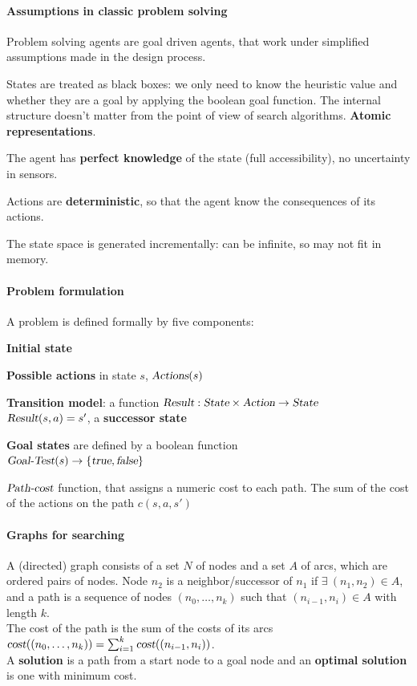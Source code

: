 \documentclass[10pt]{report}
\begin{document}
\paragraph{Assumptions in classic problem solving} Problem solving agents are goal driven agents, that work under simplified assumptions made in the design process.
\begin{list}{}{}
	\item States are treated as black boxes: we only need to know the heuristic value and whether they are a goal by applying the boolean goal function. The internal structure doesn't matter from the point of view of search algorithms. \textbf{Atomic representations}.
	\item The agent has \textbf{perfect knowledge} of the state (full accessibility), no uncertainty in sensors.
	\item Actions are \textbf{deterministic}, so that the agent know the consequences of its actions.
\end{list}
The state space is generated incrementally: can be infinite, so may not fit in memory.
\paragraph{Problem formulation} A problem is defined formally by five components:
\begin{list}{}{}
	\item \textbf{Initial state}
	\item \textbf{Possible actions} in state $s$, $\textsl{Actions}(s)$
	\item \textbf{Transition model}: a function $\textsl{Result}: \textsl{State}\times\textsl{Action}\rightarrow \textsl{State}$\\
	$\textsl{Result}(s,a) = s'$, a \textbf{successor state}
	\item \textbf{Goal states} are defined by a boolean function\\
	$\textsl{Goal-Test}(s) \rightarrow\{\textsl{true}, \textsl{false}\}$
	\item $\textsl{Path-cost}$ function, that assigns a numeric cost to each path. The sum of the cost of the actions on the path $c(s, a, s')$
\end{list}
\paragraph{Graphs for searching} A (directed) graph consists of a set $N$ of nodes and a set $A$ of arcs, which are ordered pairs of nodes. Node $n_2$ is a neighbor/successor of $n_1$ if $\exists\:(n_1, n_2)\in A$, and a path is a sequence of nodes $(n_0,\ldots,n_k)$ such that $(n_{i-1}, n_i)\in A$ with length $k$.\\The cost of the path is the sum of the costs of its arcs $\textsl{cost}((n_0,\ldots,n_k)) = \sum_{i=1}^k \textsl{cost}((n_{i-1}, n_i))$.\\
A \textbf{solution} is a path from a start node to a goal node and an \textbf{optimal solution} is one with minimum cost.
\end{document}
